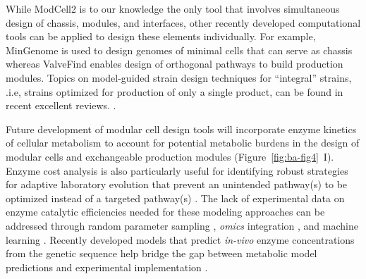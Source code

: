 While ModCell2 is to our knowledge the only tool that involves simultaneous design of chassis, modules, and interfaces, other recently developed computational tools can be applied to design these elements individually.
For example, MinGenome \citep{wang2018} is used to design genomes of minimal cells that can serve as chassis whereas ValveFind \citep{pandit2017} enables design of orthogonal pathways to build production modules.
Topics on model-guided strain design techniques for ``integral'' strains, .i.e, strains optimized for production of only a single product, can be found in recent excellent reviews.
\citep{long2015, machado2015, ng2015}.

Future development of modular cell design tools will incorporate enzyme kinetics of cellular metabolism \citep{king2015, noor2016} to account for potential metabolic burdens \citep{wu2016} in the design of modular cells and exchangeable production modules (Figure~\ref{fig:ba-fig4}~I).
Enzyme cost analysis is also particularly useful for identifying robust strategies for adaptive laboratory evolution that prevent an unintended pathway(s) to be optimized instead of a targeted pathway(s) \citep{dinh2018}.
The lack of experimental data on enzyme catalytic efficiencies needed for these modeling approaches can be addressed through random parameter sampling \citep{dinh2018}, \emph{omics} integration \citep{ebrahim2016, khodayari2016}, and machine learning \citep{heckmann2018}.
Recently developed models that predict \emph{in-vivo} enzyme concentrations from the genetic sequence help bridge the gap between metabolic model predictions and experimental implementation \citep{farasat2014, meng2013, salis2009}.

